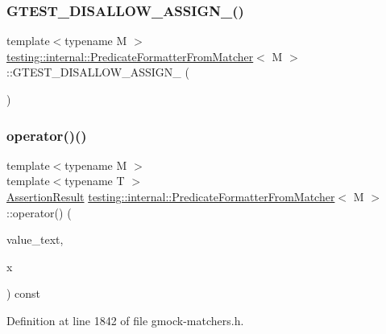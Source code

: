 \subsubsection{\texorpdfstring{G\+T\+E\+S\+T\+\_\+\+D\+I\+S\+A\+L\+L\+O\+W\+\_\+\+A\+S\+S\+I\+G\+N\+\_\+()}{GTEST\_DISALLOW\_ASSIGN\_()}}
{\footnotesize\ttfamily template$<$typename M $>$ \\
\hyperlink{classtesting_1_1internal_1_1PredicateFormatterFromMatcher}{testing\+::internal\+::\+Predicate\+Formatter\+From\+Matcher}$<$ M $>$\+::G\+T\+E\+S\+T\+\_\+\+D\+I\+S\+A\+L\+L\+O\+W\+\_\+\+A\+S\+S\+I\+G\+N\+\_\+ (\begin{DoxyParamCaption}\item[{\hyperlink{classtesting_1_1internal_1_1PredicateFormatterFromMatcher}{Predicate\+Formatter\+From\+Matcher}$<$ M $>$}]{ }\end{DoxyParamCaption})\hspace{0.3cm}{\ttfamily [private]}}

\mbox{\label{classtesting_1_1internal_1_1PredicateFormatterFromMatcher_a51d28bee5f86347ea34b7a0f2758b599}} 
\subsubsection{\texorpdfstring{operator()()}{operator()()}}
{\footnotesize\ttfamily template$<$typename M $>$ \\
template$<$typename T $>$ \\
\hyperlink{classtesting_1_1AssertionResult}{Assertion\+Result} \hyperlink{classtesting_1_1internal_1_1PredicateFormatterFromMatcher}{testing\+::internal\+::\+Predicate\+Formatter\+From\+Matcher}$<$ M $>$\+::operator() (\begin{DoxyParamCaption}\item[{const char $\ast$}]{value\+\_\+text,  }\item[{const T \&}]{x }\end{DoxyParamCaption}) const\hspace{0.3cm}{\ttfamily [inline]}}



Definition at line 1842 of file gmock-\/matchers.\+h.




